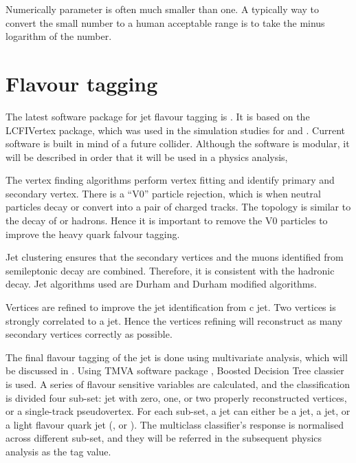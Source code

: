 Numerically \y{} parameter is often much smaller than one. A typically way to convert the small number to a human acceptable range is to take the minus logarithm of the number.

\section{Flavour tagging}
\label{sec:theoryFalvourTagging}

The latest software package for jet flavour tagging is \lcfiplus \cite{Suehara:2015ura}. It is based on the LCFIVertex package, which was used in the simulation studies for \ILCloi \cite{Abe:2010aa,Aihara:2009ad} and \CLICcdr \cite{Linssen:2012hp}. Current software is built in mind of a future \ee collider. Although the software is modular, it will be described in order that it will be used in a physics analysis,

The vertex finding algorithms perform vertex fitting and identify primary and secondary vertex. There is a ``V0'' particle rejection, which is when neutral particles decay or convert into a pair of charged tracks. The topology is similar to the decay of \Pbottom or \Pcharm hadrons. Hence it is important to remove the V0 particles to improve the heavy quark falvour tagging.

Jet clustering ensures that the secondary vertices and the muons identified from semileptonic decay are combined. Therefore, it is consistent with the hadronic decay. Jet algorithms used are Durham and Durham modified algorithms.

Vertices are refined to improve the \Pbottom jet identification from c jet. Two vertices is strongly correlated to a \Pbottom jet. Hence the vertices refining will reconstruct as many secondary vertices correctly as possible.

The final flavour tagging of the jet is done using multivariate analysis, which will be discussed in . Using TMVA software package \cite{Hocker:2007ht}, Boosted Decision Tree classier is used. A series of flavour sensitive variables are calculated, and the classification is divided four sub-set: jet with zero, one, or two properly reconstructed vertices, or a single-track pseudovertex. For each sub-set, a jet can either be a \Pbottom jet, a \Pcharm jet, or a light flavour quark jet (\Pup, \Pdown or \Pstrange). The multiclass classifier's response is normalised across different sub-set, and they will be referred in the subsequent physics analysis as the tag value.

